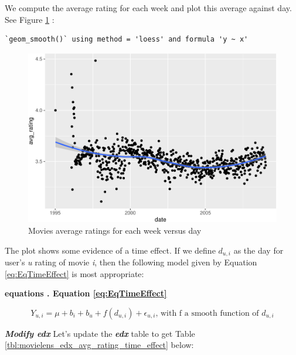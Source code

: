 \documentclass[
]{article}
\begin{document}
We compute the average rating for each week and plot this average
against day. See Figure
\ref{fig:movies_average_ratings_for_each_week_versus_day} :

\begin{verbatim}
`geom_smooth()` using method = 'loess' and formula 'y ~ x'
\end{verbatim}

\begin{figure}
\centering
\includegraphics{figures/rd_1-1.pdf}
\caption{Movies average ratings for each week versus
day\label{fig:movies_average_ratings_for_each_week_versus_day}}
\end{figure}

The plot shows some evidence of a time effect. If we define \(d_{u,i}\)
as the day for user's \emph{u} rating of movie \emph{i}, then the
following model given by Equation \ref{eq:EqTimeEffect} is most
appropriate:

%
\par\noindent\textbf{equations \theequations. Equation \ref{eq:EqTimeEffect}}
\par

\label{eq:EqTimeEffect} \begin{equation}
Y_{u,i}=\mu+b_{i}+b_{u}+f(d_{u,i})+\epsilon_{u,i}\text{, with f a smooth function of }d_{u,i}
\end{equation}

\textbf{\emph{Modify edx}} Let's update the \textbf{\emph{edx}} table to
get Table \ref{tbl:movielens_edx_avg_rating_time_effect} below:
\end{document}
